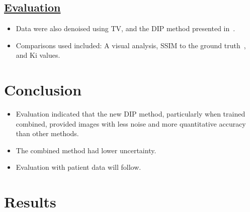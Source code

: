 \documentclass[portrait, color=UCLburgundy, margin=1cm]{uclposter}
\begin{document}
\begin{multicols}{2}
            \subsection*{\underline{\textbf{Evaluation}}}
                \begin{itemize}
                    \item Data were also denoised using \acrshort{TV}, and the \gls{DIP} method presented in~\cite{Gong2019PETPrior}.
                    \item Comparisons used included: A visual analysis, \acrshort{SSIM} to the ground truth~\cite{Wang2009MeanMeasures}, and Ki values.
                \end{itemize}
        
        \section*{Conclusion}
            \begin{highlightbox}[UCLlightgreen]
                \begin{itemize}
                    \item Evaluation indicated that the new \gls{DIP} method, particularly when trained combined, provided images with less noise and more quantitative accuracy than other methods.
                    \item The combined method had lower uncertainty.
                    \item Evaluation with patient data will follow.
                \end{itemize}
            \end{highlightbox}
        
        \AtNextBibliography{\small}
        \printbibliography
        
        \section*{Results}
            \begin{figure}[H]
                \centering
                

\end{figure}
\end{multicols}
\end{document}
